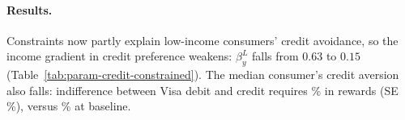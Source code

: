 \documentclass[main.tex]{subfiles}
\begin{document}
\begin{table}[ht!]
    \small
    \caption{Logistic regression: Credit card access on income}
    \label{tab:credit-access-logit}
    \centering
    
\end{table}
\paragraph{Results.} Constraints now partly explain low-income consumers' credit avoidance, so the income gradient in credit preference weakens: $\beta_y^L$ falls from $0.63$ to $0.15$ (Table~\ref{tab:param-credit-constrained}).
The median consumer's credit aversion also falls: indifference between Visa debit and credit requires \% in rewards (SE \%), versus \% at baseline.
\end{document}
